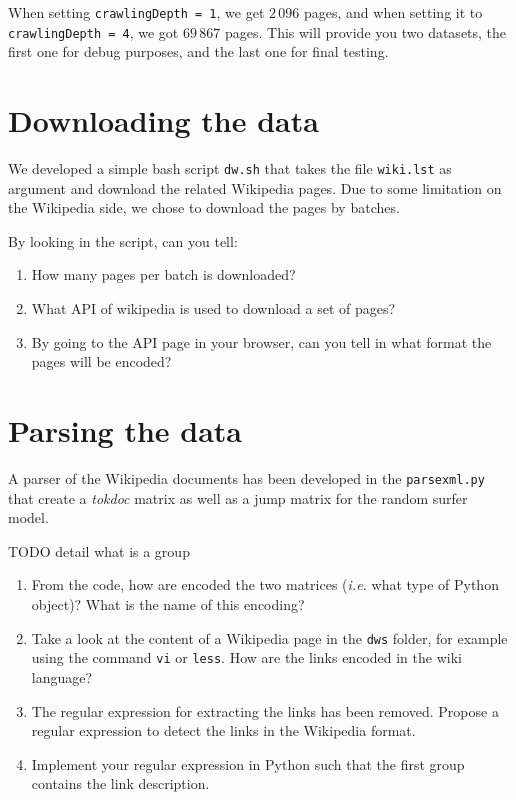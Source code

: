 \documentclass[mathserif, 11pt,c]{article}
\begin{document}
When setting \texttt{crawlingDepth = 1}, we get $2\,096$ pages, and when setting it to \texttt{crawlingDepth = 4}, we got $69\,867$ pages. This will provide you two datasets, the first one for debug purposes, and the last one for final testing.

\section{Downloading the data}

We developed a simple bash script \texttt{dw.sh} that takes the file \texttt{wiki.lst} as argument and download the related Wikipedia pages. Due to some limitation on the Wikipedia side, we chose to download the pages by batches.

By looking in the script, can you tell:
\begin{enumerate}[label=\textbf{Q\thesection.\arabic*}]
	\item How many pages per batch is downloaded?
	\item What API of wikipedia is used to download a set of pages?
	\item By going to the API page in your browser, can you tell in what format the pages will be encoded?
\end{enumerate}


\section{Parsing the data}



A parser of the Wikipedia documents has been developed in the \texttt{parsexml.py} that create a \textit{tokdoc} matrix as well as a jump matrix for the random surfer model.

TODO detail what is a group


\begin{enumerate}[label=\textbf{Q\thesection.\arabic*}]
	\item From the code, how are encoded the two matrices (\textit{i.e.} what type of Python object)? What is the name of this encoding?
	\item Take a look at the content of a Wikipedia page in the \texttt{dws} folder, for example using the command \texttt{vi} or \texttt{less}. How are the links encoded in the wiki language?
	\item The regular expression for extracting the links has been removed. Propose a regular expression to detect the links in the Wikipedia format.
	\item Implement your regular expression in Python such that the first group contains the link description.
\end{enumerate}
\end{document}
